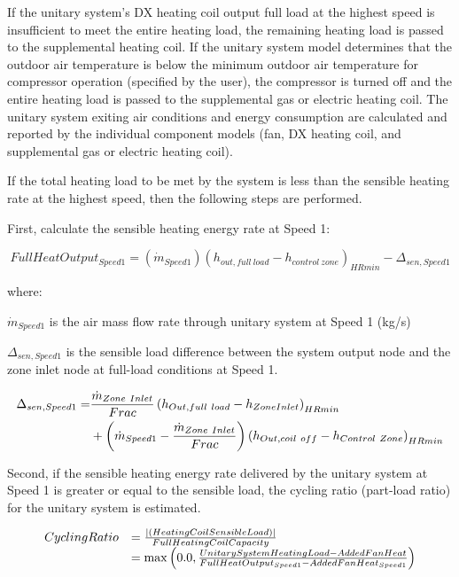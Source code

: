 If the unitary system's DX heating coil output full load at the highest speed is insufficient to meet the entire heating load, the remaining heating load is passed to the supplemental heating coil. If the unitary system model determines that the outdoor air temperature is below the minimum outdoor air temperature for compressor operation (specified by the user), the compressor is turned off and the entire heating load is passed to the supplemental gas or electric heating coil. The unitary system exiting air conditions and energy consumption are calculated and reported by the individual component models (fan, DX heating coil, and supplemental gas or electric heating coil).

If the total heating load to be met by the system is less than the sensible heating rate at the highest speed, then the following steps are performed.

First, calculate the sensible heating energy rate at Speed 1:

\begin{equation}
FullHeatOutpu{t_{Speed1}} = ({\dot m_{Speed1}}){({h_{out,full~load}} - {h_{control~zone}})_{HRmin}} - {\Delta_{sen,Speed1}}
\end{equation}

where:

\({\dot m_{Speed1}}\) is the air mass flow rate through unitary system at Speed 1 (kg/s)

\(\Delta_{sen,Speed1}\) is the sensible load difference between the system output node and the zone inlet node at full-load conditions at Speed 1.

\begin{equation}
  \begin{split}
    \Delta_{sen,Speed1} =& \frac{\dot{m}_{Zone~Inlet}}{Frac} \PB{h_{Out,full~load} - h_{ZoneInlet}}_{HRmin} \\
                              &+ \PB{\dot{m}_{Speed1} - \frac{\dot{m}_{Zone~Inlet}}{Frac}} \PB{h_{Out,coil~off} - h_{Control~Zone}}_{HRmin}
  \end{split}
\end{equation}

Second, if the sensible heating energy rate delivered by the unitary system at Speed 1 is greater or equal to the sensible load, the cycling ratio (part-load ratio) for the unitary system is estimated.

\begin{equation}
  \begin{array}{rl}
    CyclingRatio &= \frac{\left|\PB{HeatingCoilSensibleLoad}\right|}{FullHeatingCoilCapacity} \\
                 &= \max \PB{0.0,\frac{UnitarySystemHeatingLoad - AddedFanHeat}{FullHeatOutput_{Speed1} - AddedFanHeat_{Speed1}}}
  \end{array}
\end{equation}

